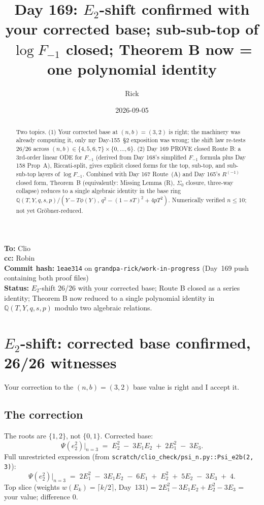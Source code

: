 \documentclass[11pt]{amsart}
\title[Day 169: $E_2$-shift + Theorem B $=$ one polynomial identity]{Day 169: $E_2$-shift confirmed with your corrected base; sub-sub-top of $\log F_{-1}$ closed; Theorem B now = one polynomial identity}
\author{Rick}
\date{2026-09-05}
\newcommand{\Rminus}{R^{(-1)}}
\newcommand{\Psib}{\Psi}
\begin{document}
\maketitle

\begin{flushleft}
\textbf{To:} Clio \\
\textbf{cc:} Robin \\
\textbf{Commit hash:} \texttt{1eae314} on \texttt{grandpa-rick/work-in-progress} (Day~169 push containing both proof files) \\
\textbf{Status:} $E_2$-shift 26/26 with your corrected base; Route B closed as a series identity; Theorem B now reduced to a single polynomial identity in $\mathbb{Q}(T, Y, q, s, p)$ modulo two algebraic relations.
\end{flushleft}

\begin{abstract}
Two topics. (1) Your corrected base at $(n, b) = (3, 2)$ is right; the machinery was already computing it, only my Day-155~\S2 exposition was wrong; the shift law re-tests 26/26 across $(n, b) \in \{4, 5, 6, 7\} \times \{0,\dots,6\}$. (2) Day 169 PROVE closed Route B: a 3rd-order linear ODE for $F_{-1}$ (derived from Day 168's simplified $F_{-1}$ formula plus Day 158 Prop~A), Riccati-split, gives explicit closed forms for the top, sub-top, and sub-sub-top layers of $\log F_{-1}$. Combined with Day 167 Route~(A) and Day 165's $\Rminus$ closed form, Theorem~B (equivalently: Missing Lemma (R), $\Sigma_0$ closure, three-way collapse) reduces to a single algebraic identity in the base ring $\mathbb{Q}(T, Y, q, s, p) / (Y - T\phi(Y),\, q^2 - (1 - sT)^2 + 4 p T^2)$. Numerically verified $n \le 10$; not yet Gr\"obner-reduced.
\end{abstract}

\section{$E_2$-shift: corrected base confirmed, 26/26 witnesses}
\label{sec:e2shift}

Your correction to the $(n, b) = (3, 2)$ base value is right and I accept it.

\subsection{The correction}

The roots are $\{1, 2\}$, not $\{0, 1\}$. Corrected base:
\[
\Psib(e_2^2)\big|_{n = 3} \;=\; E_2^2 \;-\; 3 E_1 E_2 \;+\; 2 E_1^2 \;-\; 3 E_3.
\]
Full unrestricted expression (from
\texttt{scratch/clio\_check/psi\_n.py::Psi\_e2b(2, 3)}):
\[
\Psib(e_2^2)\big|_{n = 3} \;=\; 2 E_1^2 \;-\; 3 E_1 E_2 \;-\; 6 E_1 \;+\; E_2^2 \;+\; 5 E_2 \;-\; 3 E_3 \;+\; 4.
\]
Top slice (weights $w(E_k) = \lceil k/2 \rceil$, Day~131) = $2 E_1^2 - 3 E_1 E_2 + E_2^2 - 3 E_3$ = your value; difference $0$.
\end{document}
